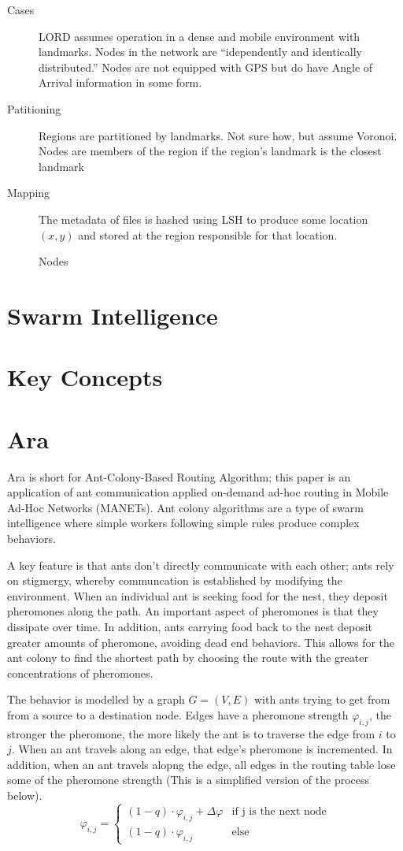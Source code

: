 \documentclass[a4paper]{article}
\begin{document}
\begin{description}
	\item[Cases] LORD assumes operation in a dense and mobile environment with landmarks.  Nodes in the network are ``idependently and identically distributed.''  Nodes are not equipped with GPS but do have Angle of Arrival information in some form.
	\item[Patitioning] Regions are partitioned by landmarks.  Not sure how, but assume Voronoi.  Nodes are members of the region if the region's landmark is the closest landmark
	\item[Mapping] The metadata of files is hashed using LSH \cite{datar2004locality} to produce some location $(x,y)$  and stored at the region responsible for that location. 
	
	Nodes
\end{description}


\section{Swarm Intelligence}

\section{Key Concepts}

\section{Ara}
Ara \cite{ara-ants} is short for Ant-Colony-Based Routing Algorithm; this paper is an application of ant communication applied on-demand ad-hoc routing in Mobile Ad-Hoc Networks (MANETs).
Ant colony algorithms are a type of swarm intelligence where simple workers following simple rules produce complex behaviors.  


A key feature is that ants don't directly communicate with each other; ants rely on stigmergy, whereby communcation is established by modifying the environment.
When an individual ant is seeking food for the nest, they deposit pheromones along the path.  An important aspect of pheromones is that they dissipate over time.  In addition, ants carrying food back to the nest deposit greater amounts of pheromone, avoiding dead end behaviors.  This allows for the ant colony to find the shortest path by choosing the route with the greater concentrations of pheromones. 

The behavior is modelled by a graph $G = (V, E)$ with ants trying to get from from a source to a destination node. Edges have a pheromone strength $\varphi_{i,j}$, the stronger the pheromone, the more likely the ant is to traverse the edge from $i$ to $j$.  When an ant travels along an edge, that edge's pheromone is incremented.  In addition, when an ant travels alopng the edge, all edges in the routing table lose some of the pheromone strength (This is a simplified version of the process below).
\[
\varphi_{i,j} =
\begin{cases}
    (1-q) \cdot \varphi_{i,j} + \Delta\varphi & \text{if j is the next node}  \\
    (1-q) \cdot \varphi_{i,j}       & \text{else}
\end{cases}
\]
\end{document}
